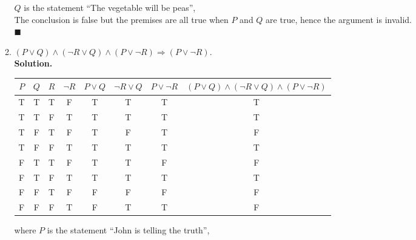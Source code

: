 \documentclass{report}
\newcommand{\sol}{\vspace{1em}\\\textbf{Solution.}\vspace{0.5em}}
\newcommand{\qed}{‎\\‎\hfill$\blacksquare$\vspace{1em}}
\begin{document}
\begin{enumerate}[leftmargin=*]
\begin{enumerate}
                    $Q$ is the statement ``The vegetable will be peas'',\\

                    The conclusion is false but the premises are all true when $P$ and $Q$ are
                    true, hence the argument is invalid.\qed

              \item $(P \vee Q) \wedge (\neg R \vee Q) \wedge
                        (P \vee \neg R) \Rightarrow (P \vee \neg R)$.
                    \sol{}
                    \begin{center}
                        \begin{tabular}{cccccccc}
                            $P$ & $Q$ & $R$ & $\neg R$ & $P \vee Q$ & $\neg R \vee Q$ & $P \vee \neg R$ & $(P \vee Q) \wedge (\neg R \vee Q) \wedge (P \vee \neg R)$ \\
                            \hline
                            T   & T   & T   & F        & T          & T               & T               & T                                                          \\
                            T   & T   & F   & T        & T          & T               & T               & T                                                          \\
                            T   & F   & T   & F        & T          & F               & T               & F                                                          \\
                            T   & F   & F   & T        & T          & T               & T               & T                                                          \\
                            F   & T   & T   & F        & T          & T               & F               & F                                                          \\
                            F   & T   & F   & T        & T          & T               & T               & T                                                          \\
                            F   & F   & T   & F        & F          & F               & F               & F                                                          \\
                            F   & F   & F   & T        & F          & T               & T               & F
                        \end{tabular}
                    \end{center}
                    where $P$ is the statement ``John is telling the truth'',


\end{enumerate}
\end{enumerate}
\end{document}
